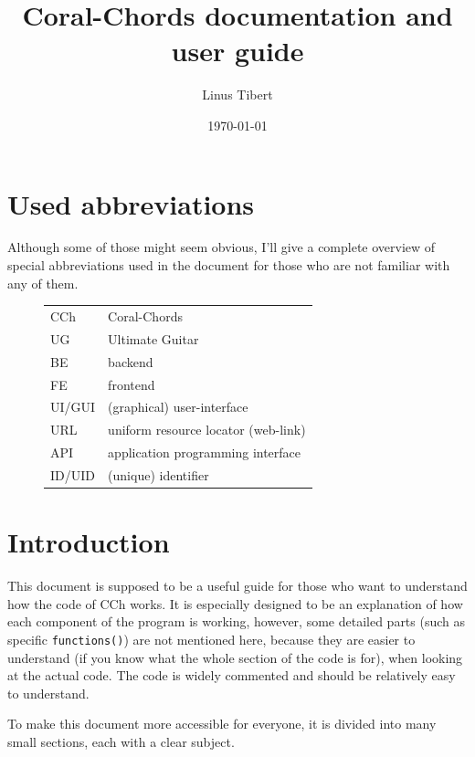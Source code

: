 \documentclass[12pt, a4paper]{article}
\title{Coral-Chords documentation and user guide}
\author{Linus Tibert}
\date{\today}
\begin{document}
        \maketitle
        \pagebreak
        \tableofcontents
        \pagebreak

        \section{Used abbreviations}
                Although some of those might seem obvious, I'll give a complete overview of special abbreviations used in the document for those who are not familiar with any of them.
                \begin{figure}[H]
                        \begin{tabular}{l l}
                                CCh & Coral-Chords\\
                                UG & Ultimate Guitar\\
                                BE & backend\\
                                FE & frontend\\
                                UI/GUI & (graphical) user-interface\\
                                URL & uniform resource locator (web-link)\\
                                API & application programming interface\\
                                ID/UID & (unique) identifier
                        \end{tabular}
                \end{figure}
                \pagebreak

        \section{Introduction}
                This document is supposed to be a useful guide for those who want to understand how the code of CCh works. It is especially designed to be an explanation of how each component of the program is working, however, some detailed parts (such as specific \texttt{functions()}) are not mentioned here, because they are easier to understand (if you know what the whole section of the code is for), when looking at the actual code. The code is widely commented and should be relatively easy to understand.

                To make this document more accessible for everyone, it is divided into many small sections, each with a clear subject.
\end{document}
